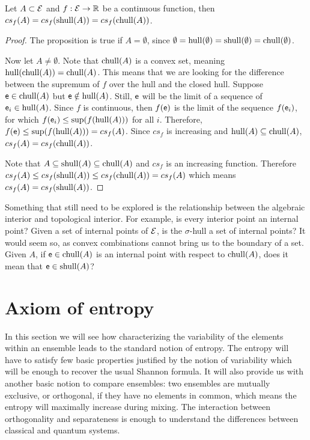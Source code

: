 \begin{mathSection}
\begin{prop}\label{pm_es_convexSupremumContinuous}
	Let $A \subset \mathcal{E}$ and $f: \mathcal{E} \to \mathbb{R}$ be a continuous function, then $cs_f(A) = cs_f(\mathrm{shull}(A)) = cs_f(\mathrm{chull}(A))$.
\end{prop}

\begin{proof}
	The proposition is true if $A = \emptyset$, since $\emptyset = \mathrm{hull}(\emptyset) = \mathrm{shull}(\emptyset) = \mathrm{chull}(\emptyset)$.
	
	Now let $A \neq \emptyset$. Note that $\mathrm{chull}(A)$ is a convex set, meaning $\mathrm{hull}(\mathrm{chull}(A)) = \mathrm{chull}(A)$. This means that we are looking for the difference between the supremum of $f$ over the hull and the closed hull. Suppose $\mathsf{e} \in \mathrm{chull}(A)$ but $\mathsf{e} \notin \mathrm{hull}(A)$. Still, $\mathsf{e}$ will be the limit of a sequence of $\mathsf{e}_i \in \mathrm{hull}(A)$. Since $f$ is continuous, then $f(\mathsf{e})$ is the limit of the sequence $f(\mathsf{e}_i)$, for which $f(\mathsf{e}_i) \leq \sup(f(\mathrm{hull}(A)))$ for all $i$. Therefore, $f(\mathsf{e}) \leq \sup(f(\mathrm{hull}(A))) = cs_f(A)$. Since $cs_f$ is increasing and $\mathrm{hull}(A) \subseteq \mathrm{chull}(A)$, $cs_f(A) = cs_f(\mathrm{chull}(A))$.
	
	Note that $A \subseteq \mathrm{shull}(A) \subseteq \mathrm{chull}(A)$ and $cs_f$ is an increasing function. Therefore $cs_f(A) \leq cs_f(\mathrm{shull}(A)) \leq cs_f(\mathrm{chull}(A)) = cs_f(A)$ which means $cs_f(A) = cs_f(\mathrm{shull}(A))$.
\end{proof}

\end{mathSection}

Something that still need to be explored is the relationship between the algebraic interior and topological interior. For example, is every interior point an internal point? Given a set of internal points of $\mathcal{E}$, is the $\sigma$-hull a set of internal points? It would seem so, as convex combinations cannot bring us to the boundary of a set. Given $A$, if $\mathsf{e} \in \mathrm{chull}(A)$ is an internal point with respect to $\mathrm{chull}(A)$, does it mean that $\mathsf{e} \in \mathrm{shull}(A)$?


\section{Axiom of entropy}

In this section we will see how characterizing the variability of the elements within an ensemble leads to the standard notion of entropy. The entropy will have to satisfy few basic properties justified by the notion of variability which will be enough to recover the usual Shannon formula. It will also provide us with another basic notion to compare ensembles: two ensembles are mutually exclusive, or orthogonal, if they have no elements in common, which means the entropy will maximally increase during mixing. The interaction between orthogonality and separateness is enough to understand the differences between classical and quantum systems.

